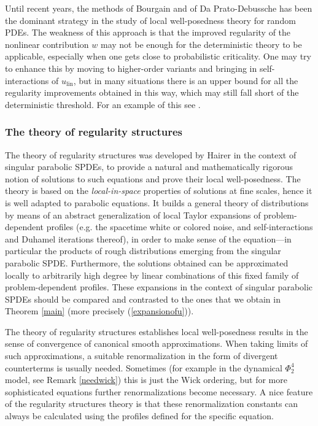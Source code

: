 \documentclass[11 pt,reqno]{amsart}
\theoremstyle{definition}
\theoremstyle{remark}
\numberwithin{equation}{section}
\begin{document}
Until recent years, the methods of Bourgain and of Da Prato-Debussche has been the dominant strategy in the study of local well-posedness theory for random PDEs. The weakness of this approach is that the improved regularity of the nonlinear contribution $w$ may not be enough for the deterministic theory to be applicable, especially when one gets close to probabilistic criticality. One may try to enhance this by moving to higher-order variants and bringing in self-interactions of $u_{\mathrm{lin}}$, but in many situations there is an upper bound for all the regularity improvements obtained in this way, which may still fall short of the deterministic threshold. For an example of this see \cite{BOP}.
\subsubsection{The theory of regularity structures}\label{regstr} The theory of regularity structures was developed by Hairer \cite{Hairer, Hairer2} in the context of singular parabolic SPDEs, to provide a natural and mathematically rigorous notion of solutions to such equations and prove their local well-posedness. The theory is based on the \emph{local-in-space} properties of solutions at fine scales, hence it is well adapted to parabolic equations. It builds a general theory of distributions by means of an abstract generalization of local Taylor expansions of problem-dependent profiles (e.g. the spacetime white or colored noise, and self-interactions and Duhamel iterations thereof), in order to make sense of the equation---in particular the products of rough distributions emerging from the singular parabolic SPDE.
Furthermore, the solutions obtained can be approximated locally to arbitrarily high degree by linear combinations of this fixed family of problem-dependent profiles. These expansions in the context of singular parabolic SPDEs should be compared and contrasted to the ones that we obtain in Theorem \ref{main} (more precisely (\ref{expansionofu})).
 
 The theory of regularity structures establishes local well-posedness results in the sense of convergence of canonical smooth approximations. When taking limits of such approximations, a suitable renormalization in the form of divergent counterterms is usually needed. Sometimes (for example in the dynamical $\Phi_2^4$ model, see Remark \ref{needwick}) this is just the Wick ordering, but for more sophisticated equations further renormalizations become necessary. A nice feature of the regularity structures theory is that these renormalization constants can always be calculated using the profiles defined for the specific equation.
\end{document}
